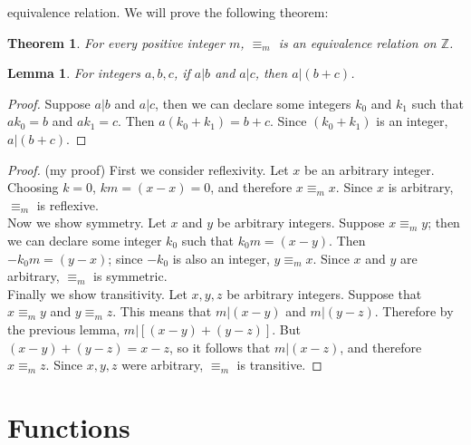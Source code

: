 \documentclass{report}
\newtheorem*{theorem}{Theorem}
\newtheorem*{lemma}{Lemma}
\theoremstyle{definition}
\begin{document}
equivalence relation. We will prove the following theorem:
\begin{theorem}
For every positive integer $m$, $\equiv_m$ is an equivalence relation on $\mathbb Z$.
\end{theorem}
\begin{lemma}
For integers $a,b,c$, if $a|b$ and $a|c$, then $a|(b+c)$.
\end{lemma}
\begin{proof}
Suppose $a|b$ and $a|c$, then we can declare some integers $k_0$ and $k_1$ such that $ak_0=b$ and $ak_1=c$. Then $a(k_0+k_1)=b+c$. Since $(k_0+k_1)$ is an integer, $a|(b+c)$.
\end{proof}
\begin{proof}(my proof)
First we consider reflexivity. Let $x$ be an arbitrary integer. Choosing $k=0$, $km=(x-x)=0$, and therefore $x\equiv_m x$. Since $x$ is arbitrary, $\equiv_m$ is reflexive.\\
\indent Now we show symmetry. Let $x$ and $y$ be arbitrary integers. Suppose $x\equiv_m y$; then we can declare some integer $k_0$ such that $k_0m=(x-y)$. Then $-k_0m=(y-x)$; since $-k_0$ is also 
an integer, $y\equiv_m x$. Since $x$ and $y$ are arbitrary, $\equiv_m$ is symmetric.\\
\indent Finally we show transitivity. Let $x,y,z$ be arbitrary integers. Suppose that $x\equiv_m y$ and $y\equiv_m z$. This means that $m|(x-y)$ and $m|(y-z)$. Therefore by the previous lemma,
$m|[(x-y)+(y-z)]$. But $(x-y)+(y-z)=x-z$, so it follows that $m|(x-z)$, and therefore $x\equiv_m z$.
Since $x,y,z$ were arbitrary, $\equiv_m$ is transitive.
\end{proof}
\newpage

\chapter{Functions}
\end{document}
